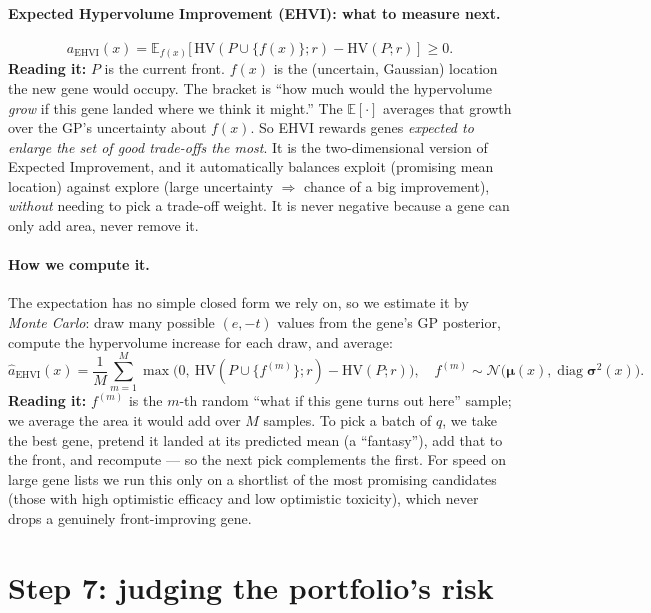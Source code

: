\documentclass[11pt]{article}
\newcommand{\E}{\mathbb{E}}
\begin{document}
\paragraph{Expected Hypervolume Improvement (EHVI): what to measure next.}
\begin{equation}
a_{\mathrm{EHVI}}(x)=\E_{f(x)}\big[\,\mathrm{HV}(P\cup\{f(x)\};r)-\mathrm{HV}(P;r)\,\big]\ \ge 0 .
\label{eq:ehvi}
\end{equation}
\textbf{Reading it:} $P$ is the current front. $f(x)$ is the (uncertain, Gaussian) location
the new gene would occupy. The bracket is ``how much would the hypervolume \emph{grow} if
this gene landed where we think it might.'' The $\E[\cdot]$ averages that growth over the
GP's uncertainty about $f(x)$. So EHVI rewards genes \emph{expected to enlarge the set of
good trade-offs the most}. It is the two-dimensional version of Expected Improvement, and
it automatically balances exploit (promising mean location) against explore (large
uncertainty $\Rightarrow$ chance of a big improvement), \emph{without} needing to pick a
trade-off weight. It is never negative because a gene can only add area, never remove it.

\paragraph{How we compute it.} The expectation has no simple closed form we rely on, so we
estimate it by \emph{Monte Carlo}: draw many possible $(e,-t)$ values from the gene's GP
posterior, compute the hypervolume increase for each draw, and average:
\begin{equation}
\hat a_{\mathrm{EHVI}}(x)=\frac1M\sum_{m=1}^{M}\max\!\big(0,\ \mathrm{HV}(P\cup\{f^{(m)}\};r)-\mathrm{HV}(P;r)\big),\quad f^{(m)}\sim\mathcal{N}\!\big(\boldsymbol\mu(x),\operatorname{diag}\boldsymbol\sigma^2(x)\big).
\end{equation}
\textbf{Reading it:} $f^{(m)}$ is the $m$-th random ``what if this gene turns out here''
sample; we average the area it would add over $M$ samples. To pick a batch of $q$, we take
the best gene, pretend it landed at its predicted mean (a ``fantasy''), add that to the
front, and recompute --- so the next pick complements the first. For speed on large gene
lists we run this only on a shortlist of the most promising candidates (those with high
optimistic efficacy and low optimistic toxicity), which never drops a genuinely
front-improving gene.

\section{Step 7: judging the portfolio's risk}
\end{document}
